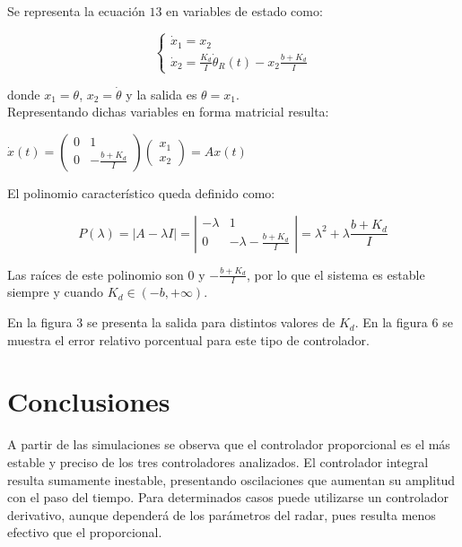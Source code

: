 \documentclass{sig-alternate}
\begin{document}
Se representa la ecuaci\'on $13$ en variables de estado como:

\begin{equation}
\label{var_estados_model3}
\begin{cases} 
    \dot x_1 = x_2 \\
    \dot x_2 = \frac{K_d}{I} \dot\theta_R(t) - x_2 \frac{b+ K_d}{I}
\end{cases}
\end{equation}

donde $x_1 = \theta$, $x_2 = \dot \theta$ y la salida es $\theta=x_1$.\\
Representando dichas variables en forma matricial resulta:

\begin{center}
$
\dot x(t) = 
\left( \begin{array}{ccc}
0 & 1 \\
0 & -\frac{b+K_d}{I}
\end{array} \right)
\left( \begin{array}{c}
x_1 \\
x_2
\end{array} \right)
= Ax(t)
$
\end{center}

El polinomio caracter\'istico queda definido como:

\begin{equation}
 P( \lambda ) = |A - \lambda I| = 
\left| \begin{array}{cc}
- \lambda & 1 \\
0 & - \lambda - \frac{b+K_d}{I}
\end{array} \right| 
=
\lambda^2 + \lambda \frac{b+K_d}{I}
\end{equation}

Las ra\'{i}ces de este polinomio son $0$ y $-\frac{b+K_d}{I}$, por lo que el
sistema es estable siempre y cuando $K_d \in (-b, +\infty)$.

En la figura $3$ se presenta la salida para distintos valores de $K_d$. En la
figura $6$ se muestra el error relativo porcentual para este tipo de controlador.

\section{Conclusiones}\label{conclusiones}
A partir de las simulaciones se observa que el controlador proporcional es el
m\'{a}s estable y preciso de los tres controladores analizados. El
controlador integral resulta sumamente inestable, presentando oscilaciones
que aumentan su amplitud con el paso del tiempo. Para determinados casos puede
utilizarse un controlador derivativo, aunque depender\'{a} de los par\'{a}metros
del radar, pues resulta menos efectivo que el proporcional.
\end{document}
